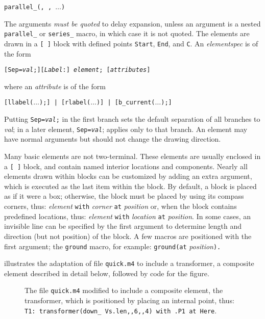 {\tt parallel\_({\RQ, \RQ,}
 $\ldots$)}

The arguments {\em must be quoted} to delay expansion, unless an argument
is a nested {\tt parallel\_} or {\tt series\_} macro,
in which case it is not quoted.
The elements are drawn in a {\tt [ ]} block with defined points
{\tt Start}, {\tt End}, and {\tt C}.
An {\sl elementspec} is of the form

{\tt [Sep={\sl val};][{\sl Label}:] {\sl element}; [{\sl attributes}]}

\noindent
where an {\sl attribute} is of the form

{\tt [llabel($\ldots$);] | [rlabel($\ldots$)] | [b\_current($\ldots$);]}

Putting {\tt Sep={\sl val};} in the first branch sets the default
separation of all branches to {\sl val}; in a later
element, {\tt Sep={\sl val}}; applies only to that branch.  
An element may have normal arguments but should
not change the drawing direction. 

Many basic elements are not two-terminal. These elements are usually enclosed in
a \verb|[ ]| \pic block, and contain named interior locations and components.
Nearly all elements drawn within blocks can be customized by adding an
extra argument, which is executed as the last item within the block.
By default, a block is placed as if it were a box; otherwise,
the block must be placed by using its compass corners, thus:
  {\sl element} {\tt with} {\sl corner} {\tt at} {\sl position} 
or, when the block contains predefined locations, thus:
  {\sl element} {\tt with} {\sl location} {\tt at} {\sl position}.
In some cases, an invisible line can be specified by the first argument
to determine length and direction (but not position) of the block.
A few macros are positioned with the first argument;
the {\tt ground} macro, for example:
  {\tt ground(}{\tt at} {\sl position}{\tt ).} 

\enlargethispage{\baselineskip}
 illustrates the adaptation of file {\tt quick.m4} to
include a transformer, a composite element described in detail below,
followed by code for the figure.
\begin{figure}[H]
   
   \caption{The file {\tt quick.m4} modified to include a composite
     element, the transformer, which is positioned by placing an
     internal point, thus:
      {\tt T1:~transformer(down\_ Vs.len,{},6,{},4) with .P1 at Here}.}
   \label{QTrans}
   \end{figure}

